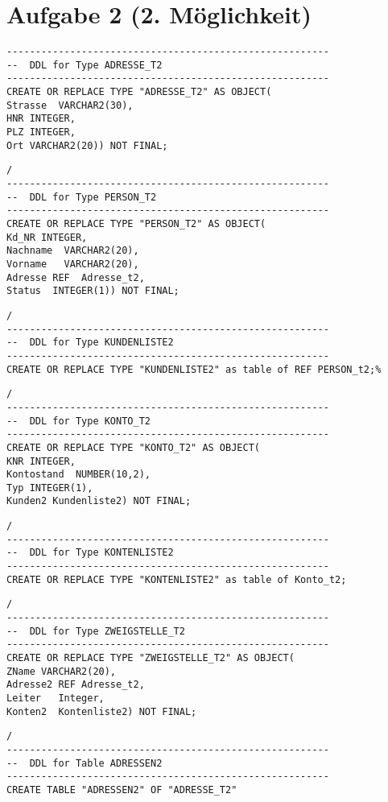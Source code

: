 \documentclass{scrartcl}
\begin{document}
\section*{Aufgabe 2 (2. Möglichkeit)}
\begin{lstlisting}
--------------------------------------------------------
--  DDL for Type ADRESSE_T2
--------------------------------------------------------
CREATE OR REPLACE TYPE "ADRESSE_T2" AS OBJECT(
Strasse  VARCHAR2(30),
HNR INTEGER,
PLZ INTEGER,
Ort VARCHAR2(20)) NOT FINAL;
\end{lstlisting}
\begin{lstlisting}
/
--------------------------------------------------------
--  DDL for Type PERSON_T2
--------------------------------------------------------
CREATE OR REPLACE TYPE "PERSON_T2" AS OBJECT(
Kd_NR INTEGER,
Nachname  VARCHAR2(20),
Vorname   VARCHAR2(20),
Adresse REF  Adresse_t2,
Status  INTEGER(1)) NOT FINAL;
\end{lstlisting}
\begin{lstlisting}
/
--------------------------------------------------------
--  DDL for Type KUNDENLISTE2
--------------------------------------------------------
CREATE OR REPLACE TYPE "KUNDENLISTE2" as table of REF PERSON_t2;%
\end{lstlisting}
\begin{lstlisting}
/
--------------------------------------------------------
--  DDL for Type KONTO_T2
--------------------------------------------------------
CREATE OR REPLACE TYPE "KONTO_T2" AS OBJECT(
KNR INTEGER,
Kontostand  NUMBER(10,2),
Typ INTEGER(1),
Kunden2 Kundenliste2) NOT FINAL;
\end{lstlisting}
\begin{lstlisting}
/
--------------------------------------------------------
--  DDL for Type KONTENLISTE2
--------------------------------------------------------
CREATE OR REPLACE TYPE "KONTENLISTE2" as table of Konto_t2;
\end{lstlisting}
\begin{lstlisting}
/
--------------------------------------------------------
--  DDL for Type ZWEIGSTELLE_T2
--------------------------------------------------------
CREATE OR REPLACE TYPE "ZWEIGSTELLE_T2" AS OBJECT(
ZName VARCHAR2(20),
Adresse2 REF Adresse_t2,
Leiter   Integer,
Konten2  Kontenliste2) NOT FINAL;
\end{lstlisting}
\begin{lstlisting}
/
--------------------------------------------------------
--  DDL for Table ADRESSEN2
--------------------------------------------------------
CREATE TABLE "ADRESSEN2" OF "ADRESSE_T2" 
\end{lstlisting}
\end{document}
